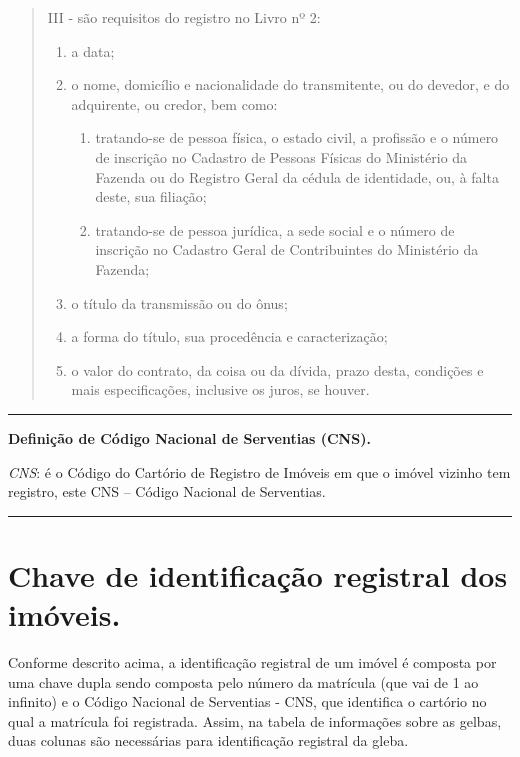 \documentclass[
  letterpaper,
]{report}
\providecommand{\tightlist}{%
  \setlength{\itemsep}{0pt}\setlength{\parskip}{0pt}}\usepackage{longtable,booktabs,array}
\begin{document}
\begin{quote}
III - são requisitos do registro no Livro nº 2:

\begin{enumerate}
\def\labelenumi{\arabic{enumi})}
\item
  a data;
\item
  o nome, domicílio e nacionalidade do transmitente, ou do devedor, e do
  adquirente, ou credor, bem como:

  \begin{enumerate}
  \def\labelenumii{\alph{enumii})}
  \tightlist
  \item
    tratando-se de pessoa física, o estado civil, a profissão e o número
    de inscrição no Cadastro de Pessoas Físicas do Ministério da Fazenda
    ou do Registro Geral da cédula de identidade, ou, à falta deste, sua
    filiação;
  \item
    tratando-se de pessoa jurídica, a sede social e o número de
    inscrição no Cadastro Geral de Contribuintes do Ministério da
    Fazenda;
  \end{enumerate}
\item
  o título da transmissão ou do ônus;
\item
  a forma do título, sua procedência e caracterização;
\item
  o valor do contrato, da coisa ou da dívida, prazo desta, condições e
  mais especificações, inclusive os juros, se houver.
\end{enumerate}
\end{quote}

\begin{center}\rule{0.5\linewidth}{0.5pt}\end{center}

\textbf{Definição de Código Nacional de Serventias (CNS).}

\emph{CNS}: é o Código do Cartório de Registro de Imóveis em que o
imóvel vizinho tem registro, este CNS -- Código Nacional de Serventias.

\begin{center}\rule{0.5\linewidth}{0.5pt}\end{center}

\hypertarget{chave-de-identificauxe7uxe3o-registral-dos-imuxf3veis.}{%
\section{Chave de identificação registral dos
imóveis.}\label{chave-de-identificauxe7uxe3o-registral-dos-imuxf3veis.}}

Conforme descrito acima, a identificação registral de um imóvel é
composta por uma chave dupla sendo composta pelo número da matrícula
(que vai de 1 ao infinito) e o Código Nacional de Serventias - CNS, que
identifica o cartório no qual a matrícula foi registrada. Assim, na
tabela de informações sobre as gelbas, duas colunas são necessárias para
identificação registral da gleba.
\end{document}
